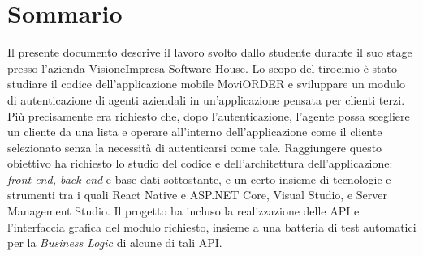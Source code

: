 \cleardoublepage
{}
{}
\begingroup
\let\clearpage\relax
\let\cleardoublepage\relax
\chapter*{Sommario}

Il presente documento descrive il lavoro svolto dallo studente \myName durante il suo stage presso l’azienda VisioneImpresa Software House.
Lo scopo del tirocinio è stato studiare il codice dell’applicazione mobile MoviORDER e sviluppare un modulo di autenticazione di agenti aziendali 
in un'applicazione pensata per clienti terzi. Più precisamente era richiesto che, dopo l’autenticazione, l’agente possa scegliere un cliente da una 
lista e operare all’interno dell’applicazione come il cliente selezionato senza la necessità di autenticarsi come tale.
Raggiungere questo obiettivo ha richiesto lo studio del codice e dell’architettura dell’applicazione: \textit{front-end, back-end} e base dati 
sottostante, e un certo insieme di tecnologie e strumenti tra i quali React Native e ASP.NET Core, Visual Studio, e Server Management Studio. 
Il progetto ha incluso la realizzazione delle API e l’interfaccia grafica del modulo richiesto, insieme a una batteria di test automatici per la 
\textit{Business Logic} di alcune di tali API.


\endgroup
\vfill
